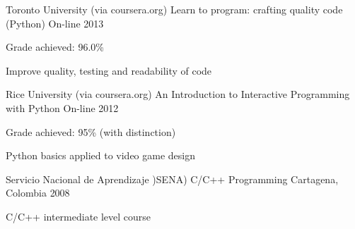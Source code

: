 \begin{cventries}
  \cventry
    {Toronto University (via coursera.org)} %
    {Learn to program: crafting quality code (Python)} %
    {On-line} %
    {2013} %
    {
      \begin{cvitems} %
        \item {Grade achieved: 96.0\%}
        \item {Improve quality, testing and readability of code}
      \end{cvitems}
    }

  \cventry
    {Rice University (via coursera.org)} %
    {An Introduction to Interactive Programming with Python} %
    {On-line} %
    {2012} %
    {
      \begin{cvitems} %
        \item {Grade achieved: 95\% (with distinction)}
        \item {Python basics applied to video game design}
      \end{cvitems}
    }
  \cventry
    {Servicio Nacional de Aprendizaje )SENA)} %
    {C/C++ Programming} %
    {Cartagena, Colombia} %
    {2008} %
    {
      \begin{cvitems} %
        \item {C/C++ intermediate level course}
      \end{cvitems}
    }

\end{cventries}
